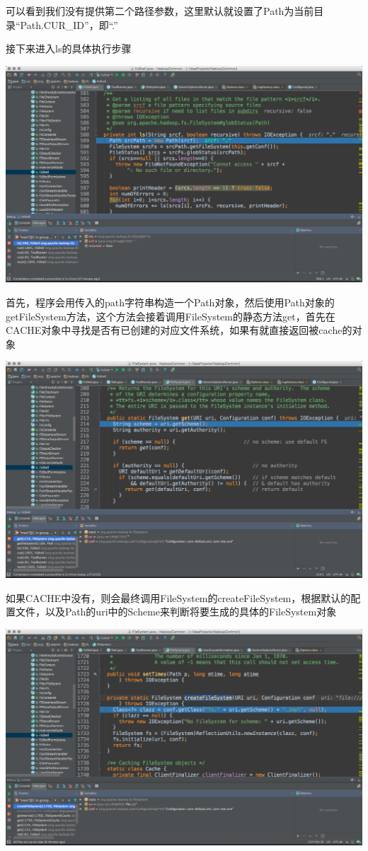 可以看到我们没有提供第二个路径参数，这里默认就设置了Path为当前目录``Path.CUR\_ID''，即``.''

接下来进入ls的具体执行步骤

\includegraphics[width=\textwidth]{image/env/cr37.png}

首先，程序会用传入的path字符串构造一个Path对象，然后使用Path对象的getFileSystem方法，这个方法会接着调用FileSystem的静态方法get，首先在CACHE对象中寻找是否有已创建的对应文件系统，如果有就直接返回被cache的对象

\includegraphics[width=\textwidth]{image/env/cr38.png}

如果CACHE中没有，则会最终调用FileSystem的createFileSystem，根据默认的配置文件，以及Path的uri中的Scheme来判断将要生成的具体的FileSystem对象

\includegraphics[width=\textwidth]{image/env/cr39.png}

